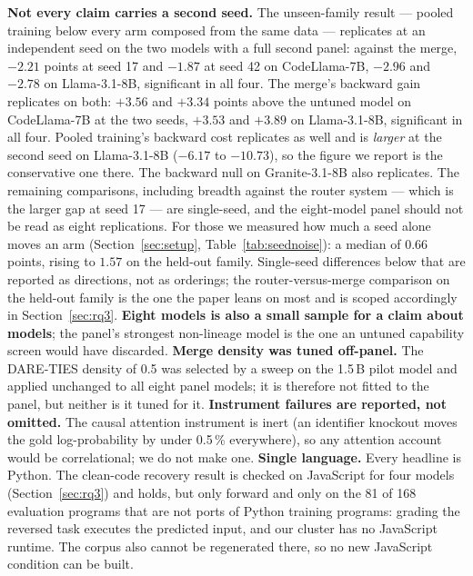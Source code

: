 \textbf{Not every claim carries a second seed.} The unseen-family result --- pooled training below every arm composed from the same data --- replicates at an independent seed on the two models with a full second panel: against the merge, $-2.21$ points at seed 17 and $-1.87$ at seed 42 on CodeLlama-7B, $-2.96$ and $-2.78$ on Llama-3.1-8B, significant in all four. The merge's backward gain replicates on both: $+3.56$ and $+3.34$ points above the untuned model on CodeLlama-7B at the two seeds, $+3.53$ and $+3.89$ on Llama-3.1-8B, significant in all four. Pooled training's backward cost replicates as well and is \emph{larger} at the second seed on Llama-3.1-8B ($-6.17$ to $-10.73$), so the figure we report is the conservative one there. The backward null on Granite-3.1-8B also replicates. The remaining comparisons, including breadth against the router system --- which is the larger gap at seed 17 --- are single-seed, and the eight-model panel should not be read as eight replications. For those we measured how much a seed alone moves an arm (Section~\ref{sec:setup}, Table~\ref{tab:seednoise}): a median of $0.66$ points, rising to $1.57$ on the held-out family. Single-seed differences below that are reported as directions, not as orderings; the router-versus-merge comparison on the held-out family is the one the paper leans on most and is scoped accordingly in Section~\ref{sec:rq3}. \textbf{Eight models is also a small sample for a claim about models}; the panel's strongest non-lineage model is the one an untuned capability screen would have discarded. \textbf{Merge density was tuned off-panel.} The DARE-TIES density of 0.5 was selected by a sweep on
the 1.5\,B pilot model and applied unchanged to all eight panel models; it is therefore not fitted to
the panel, but neither is it tuned for it. \textbf{Instrument failures are reported, not omitted.}
The causal attention instrument is inert (an identifier knockout moves the gold log-probability by
under 0.5\,\% everywhere), so any attention account would be correlational; we do not make one.
\textbf{Single language.} Every headline is Python. The clean-code recovery result is checked on
JavaScript for four models (Section~\ref{sec:rq3}) and holds, but only forward and only on the 81 of
168 evaluation programs that are not ports of Python training programs: grading the reversed task
executes the predicted input, and our cluster has no JavaScript runtime. The corpus also cannot be
regenerated there, so no new JavaScript condition can be built.
